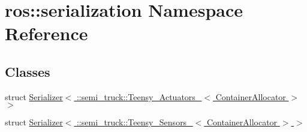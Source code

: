 \hypertarget{namespaceros_1_1serialization}{}\section{ros\+:\+:serialization Namespace Reference}
\label{namespaceros_1_1serialization}
\subsection*{Classes}
\begin{DoxyCompactItemize}
\item 
struct \hyperlink{structros_1_1serialization_1_1_serializer_3_01_1_1semi__truck_1_1_teensy___actuators___3_01_container_allocator_01_4_01_4}{Serializer$<$ \+::semi\+\_\+truck\+::\+Teensy\+\_\+\+Actuators\+\_\+$<$ Container\+Allocator $>$ $>$}
\item 
struct \hyperlink{structros_1_1serialization_1_1_serializer_3_01_1_1semi__truck_1_1_teensy___sensors___3_01_container_allocator_01_4_01_4}{Serializer$<$ \+::semi\+\_\+truck\+::\+Teensy\+\_\+\+Sensors\+\_\+$<$ Container\+Allocator $>$ $>$}
\end{DoxyCompactItemize}
